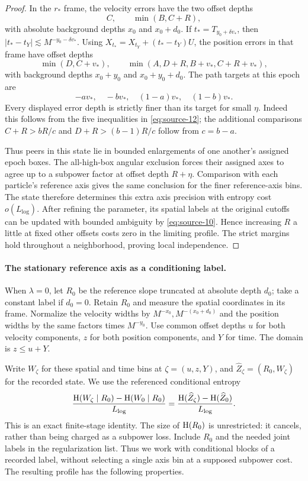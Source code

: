 \begin{proof}
In the $r_*$ frame, the velocity errors have the two offset depths
\[
C,\qquad \min(B,C+R),
\]
with absolute background depths $x_0$ and $x_0+d_0$.  If
$t_*=T_{y_0+\delta v_*}$, then
$|t_*-t_Y|\lesssim M^{-y_0-\delta v_*}$.
Using $X_{t_*}=X_{t_Y}+(t_*-t_Y)U$, the position errors in that
frame have offset depths
\[
\min(D,C+v_*),\qquad
\min(A,D+R,B+v_*,C+R+v_*),
\]
with background depths $x_0+y_0$ and $x_0+y_0+d_0$.
The path targets at this epoch are
\[
-av_*,\quad -bv_*,\quad (1-a)v_*,\quad (1-b)v_*.
\]
Every displayed error depth is strictly finer than its target for
small $\eta$.  Indeed this follows from the five inequalities in
\eqref{eq:source-12}; the additional comparisons
$C+R>bR/c$ and $D+R>(b-1)R/c$ follow from $c=b-a$.

Thus peers in this state lie in bounded enlargements of one
another's assigned epoch boxes.  The all-high-box angular exclusion
forces their assigned axes to agree up to a subpower factor at
offset depth $R+\eta$.  Comparison with each particle's reference
axis gives the same conclusion for the finer reference-axis bins.
The state therefore determines this extra axis precision with
entropy cost $o(L_{\log})$.  After refining the parameter, its
spatial labels at the original cutoffs can be updated with bounded
ambiguity by \eqref{eq:source-10}.  Hence increasing $R$ a little
at fixed other offsets costs zero in the limiting profile.  The
strict margins hold throughout a neighborhood, proving local
independence.
\end{proof}

\paragraph{The stationary reference axis as a conditioning label.}
When $\lambda=0$, let $R_0$ be the reference slope truncated at
absolute depth $d_0$; take a constant label if $d_0=0$.  Retain
$R_0$ and measure the spatial coordinates in its frame.  Normalize
the velocity widths by $M^{-x_0},M^{-(x_0+d_0)}$ and the position
widths by the same factors times $M^{-y_0}$.  Use common offset
depths $u$ for both velocity components, $z$ for both position
components, and $Y$ for time.  The domain is $z\leq u+Y$.

Write $W_\zeta$ for these spatial and time bins at
$\zeta=(u,z,Y)$, and $\widehat Z_\zeta=(R_0,W_\zeta)$ for the
recorded state.  We use the referenced conditional entropy
\begin{equation}\label{ent:stationary-axis-cancellation}
\frac{\operatorname{H}(W_\zeta\mid R_0)-\operatorname{H}(W_0\mid R_0)}{L_{\log}}
=\frac{\operatorname{H}(\widehat Z_\zeta)-\operatorname{H}(\widehat Z_0)}{L_{\log}}.
\end{equation}
This is an exact finite-stage identity.  The size of $\operatorname{H}(R_0)$
is unrestricted: it cancels, rather than being charged as a
subpower loss.  Include $R_0$ and the needed joint labels in the
regularization list.  Thus we work with conditional blocks of a
recorded label, without selecting a single axis bin at a supposed
subpower cost.  The resulting profile has the following properties.

